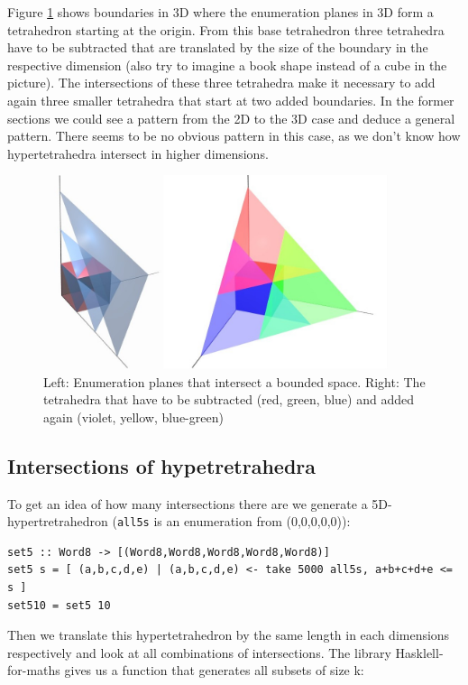 \documentclass{tmr}
\begin{document}
Figure \ref{enum3bounded} shows boundaries in 3D where the enumeration planes in 3D form a tetrahedron starting at the origin. From this base tetrahedron three tetrahedra have to be subtracted that are translated by the size of the boundary in the respective dimension (also try to imagine a book shape instead of a cube in the picture). The intersections of these three tetrahedra make it necessary to add again three smaller tetrahedra that start at two added boundaries. In the former sections we could see a pattern from the 2D to the 3D case and deduce a general pattern. There seems to be no obvious pattern in this case, as we don't know how hypertetrahedra intersect in higher dimensions.

\begin{figure}[htbp]
  \centering
    \includegraphics[width=0.9\textwidth]{planes.jpg}
    \caption{Left: Enumeration planes that intersect a bounded space. Right: The tetrahedra that have to be subtracted (red, green, blue) and added again (violet, yellow, blue-green) }
  \label{enum3bounded}
\end{figure}

\subsection{Intersections of hypetretrahedra}
To get an idea of how many intersections there are we generate a 5D-hypertretrahedron (\verb|all5s| is an enumeration from (0,0,0,0,0)):

\begin{Verbatim}
set5 :: Word8 -> [(Word8,Word8,Word8,Word8,Word8)]
set5 s = [ (a,b,c,d,e) | (a,b,c,d,e) <- take 5000 all5s, a+b+c+d+e <= s ]
set510 = set5 10
\end{Verbatim}

Then we translate this hypertetrahedron by the same length in each dimensions respectively and look at all combinations of intersections.
The library Hasklell-for-maths gives us a function that generates all subsets of size k:
\end{document}
